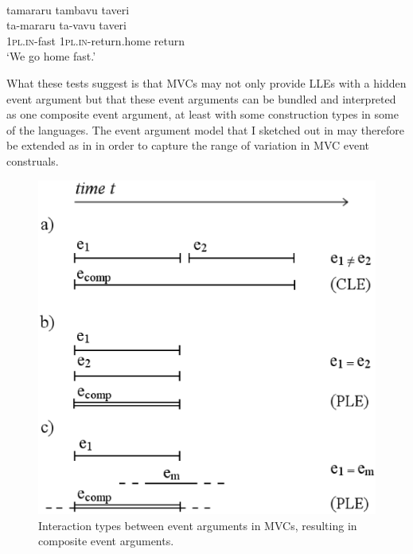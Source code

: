 \ea \label{Wooi41} 
\\
\glll tamararu tambavu taveri \\
ta-mararu ta-vavu taveri \\
1\textsc{pl}.\textsc{in}-fast 1\textsc{pl}.\textsc{in}-return.home return\\
\glft `We go home fast.' \\ 
\z

What these tests suggest is that MVCs may not only provide LLEs with a hidden event argument but that these event arguments can be bundled and interpreted as one composite event argument, at least with some construction types in some of the languages. The event argument model that I sketched out in  may therefore be extended as in  in order to capture the range of variation in MVC event construals.

\begin{figure}
\includegraphics[width=1.0\textwidth]{figures/eventschemamod.eps} 
\caption{Interaction types between event arguments in MVCs, resulting in composite event arguments.}\label{fig:eventsmod2}
\end{figure}


